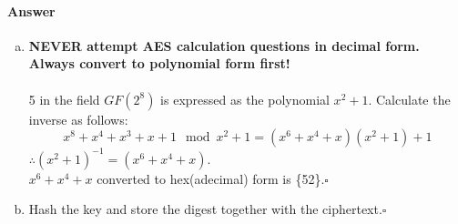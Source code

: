 \documentclass[12pt]{article}
\begin{document}
\paragraph{Answer}
\begin{enumerate}[(a)]
\item 
\textbf{NEVER attempt AES calculation questions in decimal form. Always convert to polynomial form first!}\\\\
5 in the field $GF(2^8)$ is expressed as the polynomial $x^2+1$. Calculate the inverse as follows:
\begin{equation*}
x^8+x^4+x^3+x+1\mod x^2+1=(x^6+x^4+x)(x^2+1)+1
\end{equation*}
$\therefore (x^2+1)^{-1}=(x^6+x^4+x)$.\\
$x^6+x^4+x$ converted to hex(adecimal) form is \{52\}.\hfill $\square$
\item Hash the key and store the digest together with the ciphertext.\hfill $\square$
\end{enumerate}
\end{document}
